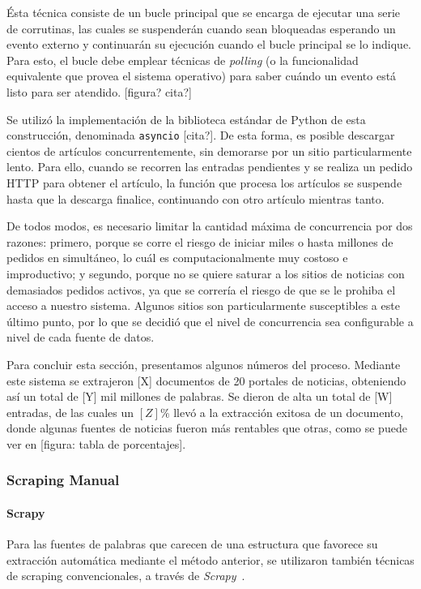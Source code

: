 Ésta técnica consiste de un bucle principal que se encarga de ejecutar una serie de corrutinas, las
cuales se suspenderán cuando sean bloqueadas esperando un evento externo y continuarán su ejecución
cuando el bucle principal se lo indique. Para esto, el bucle debe emplear técnicas de
\textit{polling} (o la funcionalidad equivalente que provea el sistema operativo) para saber cuándo
un evento está listo para ser atendido. [figura? cita?]

Se utilizó la implementación de la biblioteca estándar de Python de esta construcción, denominada
\texttt{asyncio} [cita?]. De esta forma, es posible descargar cientos de artículos concurrentemente,
sin demorarse por un sitio particularmente lento. Para ello, cuando se recorren las entradas
pendientes y se realiza un pedido HTTP para obtener el artículo, la función que procesa los
artículos se suspende hasta que la descarga finalice, continuando con otro artículo mientras tanto.

De todos modos, es necesario limitar la cantidad máxima de concurrencia por dos razones: primero,
porque se corre el riesgo de iniciar miles o hasta millones de pedidos en simultáneo, lo cuál es
computacionalmente muy costoso e improductivo; y segundo, porque no se quiere saturar a los sitios
de noticias con demasiados pedidos activos, ya que se correría el riesgo de que se le prohiba el
acceso a nuestro sistema. Algunos sitios son particularmente susceptibles a este último punto, por
lo que se decidió que el nivel de concurrencia sea configurable a nivel de cada fuente de datos.


Para concluir esta sección, presentamos algunos números del proceso. Mediante este sistema se
extrajeron [X] documentos de 20 portales de noticias, obteniendo así un total de [Y] mil millones de
palabras. Se dieron de alta un total de [W] entradas, de las cuales un $[Z]\%$ llevó a la extracción
exitosa de un documento, donde algunas fuentes de noticias fueron más rentables que otras, como se
puede ver en [figura: tabla de porcentajes].


\subsubsection{Scraping Manual}

\paragraph{Scrapy}

Para las fuentes de palabras que carecen de una estructura que favorece su extracción automática
mediante el método anterior, se utilizaron también técnicas de scraping convencionales, a través de
\textit{Scrapy}~\cite{Scrapy}.

